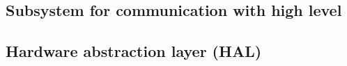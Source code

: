 \documentclass[a4paper,12pt]{article} %
\begin{document}
\subsection{Subsystem for communication with high level}

\subsection{Hardware abstraction layer (HAL)}


\end{document}
